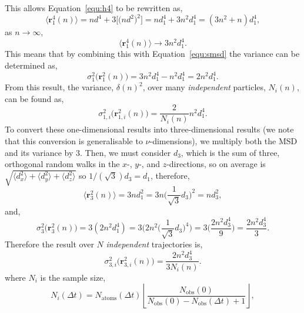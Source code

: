 \documentclass[reprint,superscriptaddress,nobibnotes,amsmath,amssymb,aps,onecolumn]{revtex4-2}
\begin{document}
%
This allows Equation~\ref{equ:h4} to be rewritten as,
%
\begin{equation}
    \Big\langle \mathbf{r}_1^4(n) \Big\rangle = nd^4 + 3\Big[\big(nd^2\big)^2\Big] = nd_1^4 + 3n^2d_1^4 = (3n^2 + n) d_1^4,
\end{equation}
%
as $n \to \infty$,
\begin{equation}
    \Big\langle \mathbf{r}_1^4(n) \Big\rangle \to 3n^2d_1^4.
    \label{equ:r4}
\end{equation}
%
This means that by combining this with Equation~\ref{equ:smsd} the variance can be determined as,
%
\begin{equation}
    \sigma_1^2\big(\mathbf{r}_1^2(n)\big) = 3n^2d_1^4 - n^2 d_1^4 = 2n^2d_1^4.
\end{equation}
%
From this result, the variance, $\delta(n) ^ 2$, over many \emph{independent} particles, $N_i(n)$, can be found as,
%
\begin{equation}
    \sigma_{1,i}^2\big(\mathbf{r}_{1,i}^2(n)\big) = \frac{2}{N_i(n)}n^2d_1^4.
\end{equation}
%
To convert these one-dimensional results into three-dimensional results (we note that this conversion is generalisable to $\nu$-dimensions), we multiply both the MSD and its variance by \num{3}.
Then, we must consider $d_3$, which is the sum of three, orthogonal random walks in the $x$-, $y$-, and $z$-directions, so on average is $\sqrt{\langle d_x^2 \rangle + \langle d_y^2 \rangle + \langle d_z^2 \rangle}$ so $1/(\sqrt{3})d_3 = d_1$, therefore,
%
\begin{equation}
    \langle \mathbf{r}_3^2(n) \rangle = 3nd_1^2 = 3n\bigg(\frac{1}{\sqrt{3}}d_3\bigg)^2 = n d_3^2,
\end{equation}
%
and,
%
\begin{equation}
    \sigma_3^2\big(\mathbf{r}_{3}^2(n)\big) = 3(2n^2d_1^4)  = 3\Bigg(2n^2 \bigg(\frac{1}{\sqrt{3}}d_3\bigg)^4\Bigg) = 3\bigg(\frac{2n^2d_3^4}{9}\bigg) = \frac{2n^2d_3^4}{3}.
\end{equation}
%
Therefore the result over $N$ \emph{independent} trajectories is,
%
\begin{equation}
    \sigma_{3,i}^2\big(\mathbf{r}_{3,i}^2(n)\big) = \frac{2n^2d_3^4}{3N_i(n)}.
\end{equation}
%
where $N_i$ is the sample size,
%
\begin{equation}
    N_i(\Delta t) =  N_{\mathrm{atoms}}(\Delta t)\left\lfloor\frac{N_{\mathrm{obs}}(0)}{N_{\mathrm{obs}}(0) - N_{\mathrm{obs}}(\Delta t) + 1}\right\rfloor,
    \label{equ:samples}
\end{equation}
\end{document}
